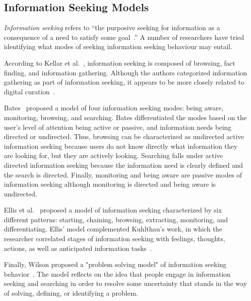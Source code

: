 {{\subsection{Information Seeking Models}
\textit{Information seeking} refers to ``the purposive seeking for information as a consequence of a need to satisfy some goal~\cite{wilson2000human}.'' A number of researchers have tried identifying what modes of seeking information seeking behaviour may entail. 

According to Kellar et al.~\cite{kellar2006goal}, information seeking is composed of browsing, fact finding, and information gathering. Although the authors categorized information gathering as part of information seeking, it appears to be more closely related to digital curation~\cite{beagrie2008digital,whittaker2011personal}. 

Bates~\cite{bates1986exploratory,bates2002toward} proposed a model of four information seeking modes: being aware, monitoring, browsing, and searching. Bates differentiated the modes based on the user's level of attention being active or passive, and information needs being directed or undirected. Thus, browsing can be characterized as undirected active information seeking because users do not know directly what information they are looking for, but they are actively looking. Searching falls under active directed information seeking because the information need is clearly defined and the search is directed. Finally, monitoring and being aware are passive modes of information seeking although monitoring is directed and being aware is undirected.

Ellis et al.~\cite{ellis1989behavioural,ellis1993comparison,ellis1997modelling} proposed a model of information seeking characterized by six different patterns: starting, chaining, browsing, extracting, monitoring, and differentiating. Ellis' model complemented Kuhlthau's work, in which the researcher correlated stages of information seeking with feelings, thoughts, actions, as well as anticipated information tasks~\cite{kuhlthau1991inside}.

Finally, Wilson proposed a "problem solving model" of information seeking behavior~\cite{wilson1999models}. The model reflects on the idea that people engage in information seeking and searching in order to resolve some uncertainty that stands in the way of solving, defining, or identifying a problem.  
} %

}
